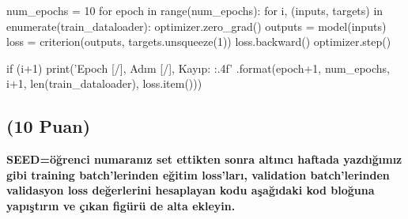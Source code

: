 \documentclass[11pt]{article}
\begin{document}
\begin{python}
num_epochs = 10
for epoch in range(num_epochs):
    for i, (inputs, targets) in enumerate(train_dataloader):
        optimizer.zero_grad()
        outputs = model(inputs)
        loss = criterion(outputs, targets.unsqueeze(1))
        loss.backward()
        optimizer.step()

        if (i+1) %
            print('Epoch [{}/{}], Adım [{}/{}], Kayıp: {:.4f}'
                  .format(epoch+1, num_epochs, i+1, len(train_dataloader), loss.item()))




\end{python}

\subsection{(10 Puan)} \textbf{SEED=öğrenci numaranız set ettikten sonra altıncı haftada yazdığımız gibi training batch'lerinden eğitim loss'ları, validation batch'lerinden validasyon loss değerlerini hesaplayan kodu aşağıdaki kod bloğuna yapıştırın ve çıkan figürü de alta ekleyin.}
\end{document}
